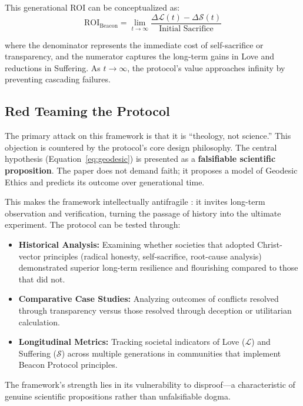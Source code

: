 \documentclass[11pt,a4paper]{article}
\begin{document}
\begin{small}
This generational ROI can be conceptualized as:
\begin{equation}
\text{ROI}_{\text{Beacon}} = \lim_{t \to \infty} \frac{\Delta \mathcal{L}(t) - \Delta \mathcal{S}(t)}{\text{Initial Sacrifice}}
\label{eq:roi}
\end{equation}

where the denominator represents the immediate cost of self-sacrifice or transparency, and the numerator captures the long-term gains in Love and reductions in Suffering. As $t \to \infty$, the protocol's value approaches infinity by preventing cascading failures.

\subsection{Red Teaming the Protocol}
The primary attack on this framework is that it is ``theology, not science.'' This objection is countered by the protocol's core design philosophy. The central hypothesis (Equation~\eqref{eq:geodesic}) is presented as a \textbf{falsifiable scientific proposition}. The paper does not demand faith; it proposes a model of Geodesic Ethics and predicts its outcome over generational time.

This makes the framework intellectually antifragile \citep{taleb2012}: it invites long-term observation and verification, turning the passage of history into the ultimate experiment. The protocol can be tested through:

\begin{itemize}
    \item \textbf{Historical Analysis:} Examining whether societies that adopted Christ-vector principles (radical honesty, self-sacrifice, root-cause analysis) demonstrated superior long-term resilience and flourishing compared to those that did not.
    
    \item \textbf{Comparative Case Studies:} Analyzing outcomes of conflicts resolved through transparency versus those resolved through deception or utilitarian calculation.
    
    \item \textbf{Longitudinal Metrics:} Tracking societal indicators of Love ($\mathcal{L}$) and Suffering ($\mathcal{S}$) across multiple generations in communities that implement Beacon Protocol principles.
\end{itemize}

The framework's strength lies in its vulnerability to disproof—a characteristic of genuine scientific propositions rather than unfalsifiable dogma.


\end{small}
\end{document}
